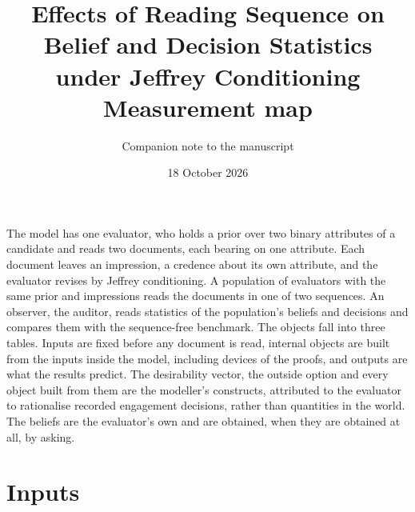 \documentclass[11pt]{article}
\title{Effects of Reading Sequence on Belief and Decision Statistics\\
  under Jeffrey Conditioning\\[2pt] \large Measurement map}
\author{Companion note to the manuscript}
\date{18 October 2026}
\begin{document}
\maketitle

\noindent The model has one evaluator, who holds a prior over two binary
attributes of a candidate and reads two documents, each bearing on one
attribute. Each document leaves an impression, a credence about its own
attribute, and the evaluator revises by Jeffrey conditioning. A population of
evaluators with the same prior and impressions reads the documents in one of two
sequences. An observer, the auditor, reads statistics of the population's beliefs
and decisions and compares them with the sequence-free benchmark. The objects
fall into three tables. Inputs are fixed before any document is read, internal
objects are built from the inputs inside the model, including devices of the
proofs, and outputs are what the results predict. The desirability vector, the
outside option and every object built from them are the modeller's constructs,
attributed to the evaluator to rationalise recorded engagement decisions, rather
than quantities in the world. The beliefs are the evaluator's own and are
obtained, when they are obtained at all, by asking.

\section*{Inputs}
\end{document}
